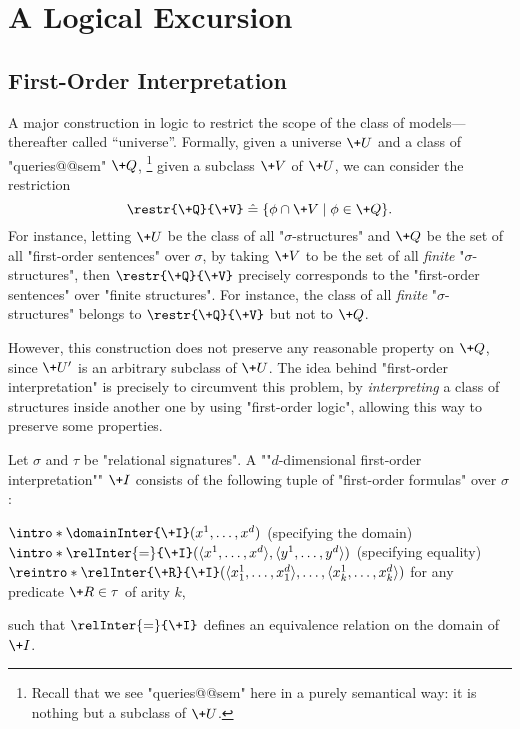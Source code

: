 \section{A Logical Excursion}
\label{sec:preliminaries-automatic-structures-logic}

\subsection{First-Order Interpretation}

A major construction in logic to restrict the scope of the class
of models---thereafter called ``universe''.
Formally, given a universe $\+U$ and a class of "queries@@sem" $\+Q$,%
\footnote{Recall that we see "queries@@sem" here in a purely semantical way: it is nothing but a subclass of $\+U$.}
given a subclass $\+V$ of $\+U$, we can consider the restriction
\[
	\restr{\+Q}{\+V} \defeq \{\phi \cap \+V \mid \phi \in \+Q\}.
\]
For instance, letting $\+U$ be the class of all "$\sigma$-structures" and $\+Q$ be the set of all 
"first-order sentences" over $\sigma$, by taking $\+V$ to be the set of all \emph{finite}
"$\sigma$-structures", then $\restr{\+Q}{\+V}$ precisely corresponds to
the "first-order sentences" over "finite structures". For instance, the class of all
\emph{finite} "$\sigma$-structures" belongs to $\restr{\+Q}{\+V}$ but not to
$\+Q$.

However, this construction does not preserve any reasonable property on $\+Q$,
since $\+U'$ is an arbitrary subclass of $\+U$. The idea behind "first-order interpretation"
is precisely to circumvent this problem, by \emph{interpreting} a class of structures
inside another one by using "first-order logic", allowing this way to preserve some properties.

Let $\sigma$ and $\tau$ be "relational signatures".
A \AP ""$d$-dimensional first-order interpretation"" $\+I$ consists of the following tuple of
"first-order formulas" over $\sigma$:
\begin{itemize}
	\itemAP $\intro*\domainInter{\+I}(x^1,\dotsc, x^d)$ (specifying the domain)
	\itemAP $\intro*\relInter{=}{\+I}(\tup{x^1,\dotsc, x^d}, \tup{y^1,\dotsc, y^d})$ (specifying equality)
	\itemAP $\reintro*\relInter{\+R}{\+I}(\tup{x^1_1,\dotsc,x^d_1}, \dotsc, \tup{x^1_k,\dotsc,x^d_k})$
		for any predicate $\+R \in \tau$ of arity $k$,
\end{itemize}
such that $\relInter{=}{\+I}$ defines an equivalence relation on the domain of $\+I$.


